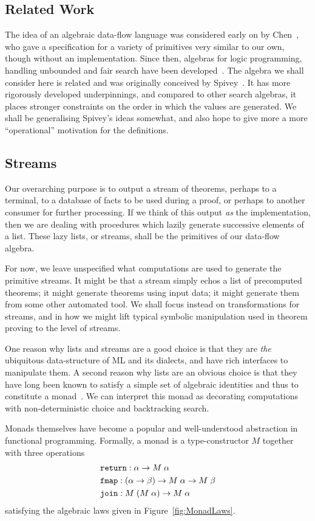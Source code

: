 \subsection{Related Work}
The idea of an algebraic data-flow language was considered early on by Chen~\cite{ChenForwardChaining}, who gave a specification for a variety of primitives very similar to our own, though without an implementation. Since then, algebras for logic programming, handling unbounded and fair search have been developed~\cite{BacktrackingMonad}. The algebra we shall consider here is related and was originally conceived by Spivey~\cite{SearchAlgebras}. It has more rigorously developed underpinnings, and compared to other search algebras, it places stronger constraints on the order in which the values are generated. We shall be generalising Spivey's ideas somewhat, and also hope to give more a more ``operational'' motivation for the definitions.

\subsection{Streams}\label{sec:Streams}
Our overarching purpose is to output a stream of theorems, perhaps to a terminal, to a database of facts to be used during a proof, or perhaps to another consumer for further processing. If we think of this output \emph{as} the implementation, then we are dealing with procedures which lazily generate successive elements of a list. These lazy lists, or streams, shall be the primitives of our data-flow algebra. 

For now, we leave unspecified what computations are used to generate the primitive streams. It might be that a stream simply echos a list of precomputed theorems; it might generate theorems using input data; it might generate them from some other automated tool. We shall focus instead on transformations for streams, and in how we might lift typical symbolic manipulation used in theorem proving to the level of streams.

One reason why lists and streams are a good choice is that they are \emph{the} ubiquitous data-structure of ML and its dialects, and have rich interfaces to manipulate them. A second reason why lists are an obvious choice is that they have long been known to satisfy a simple set of algebraic identities and thus to constitute a monad~\cite{MonadWadler}. We can interpret this monad as decorating computations with non-deterministic choice and backtracking search. 

Monads themselves have become a popular and well-understood abstraction in functional programming. Formally, a monad is a type-constructor $M$ together with three operations 
\begin{align*}
&\texttt{return} : \alpha \rightarrow M\;\alpha\\
&\texttt{fmap} : (\alpha \rightarrow \beta) \rightarrow M\;\alpha \rightarrow M\;\beta\\
&\texttt{join} : M\;(M\;\alpha) \rightarrow M\;\alpha
\end{align*}
satisfying the algebraic laws given in Figure~\ref{fig:MonadLaws}.

